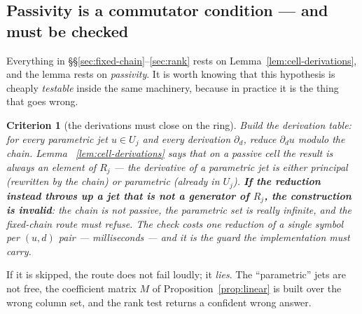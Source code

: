 \documentclass[11pt]{article}
\newtheorem{criterion}{Criterion}
\begin{document}
\subsection{Passivity is a commutator condition --- and must be checked}
\label{sec:passivity}

Everything in \S\S\ref{sec:fixed-chain}--\ref{sec:rank} rests on
Lemma~\ref{lem:cell-derivations}, and the lemma rests on \emph{passivity}. It is
worth knowing that this hypothesis is cheaply \emph{testable} inside the same
machinery, because in practice it is the thing that goes wrong.

\begin{criterion}[the derivations must close on the ring]
\label{crit:passive}
Build the derivation table: for every parametric jet $u \in U_j$ and every
derivation $\partial_d$, reduce $\partial_d u$ modulo the chain. Lemma~%
\ref{lem:cell-derivations} says that on a \emph{passive} cell the result is
always an element of $R_j$ --- the derivative of a parametric jet is either
principal (rewritten by the chain) or parametric (already in $U_j$). \textbf{If
the reduction instead throws up a jet that is not a generator of $R_j$, the
construction is invalid}: the chain is not passive, the parametric set is really
infinite, and the fixed-chain route must refuse. The check costs one reduction of
a single symbol per $(u,d)$ pair --- milliseconds --- and it is the guard the
implementation must carry.
\end{criterion}

If it is skipped, the route does not fail loudly; it \emph{lies}. The
``parametric'' jets are not free, the coefficient matrix $M$ of
Proposition~\ref{prop:linear} is built over the wrong column set, and the rank
test returns a confident wrong answer.
\end{document}
